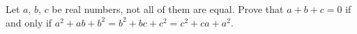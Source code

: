 Let $a$, $b$, $c$ be real numbers, not all of them are equal. Prove that $a+b+c=0$ if and only if $a^2+ab+b^2=b^2+bc+c^2=c^2+ca+a^2$.